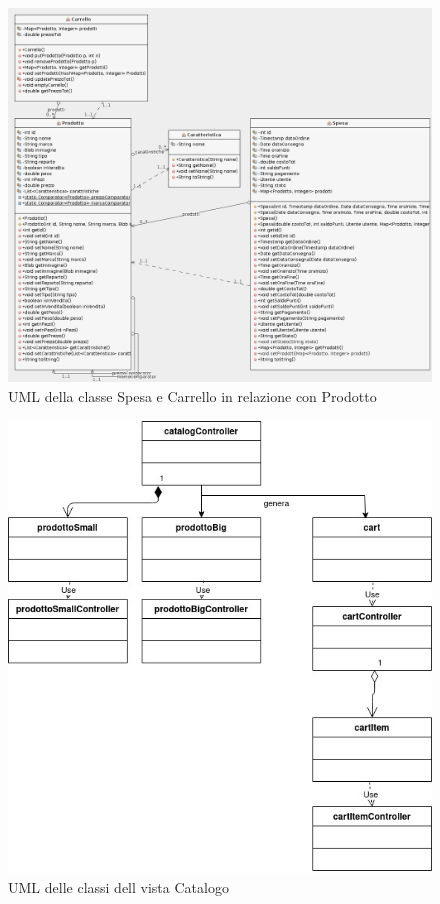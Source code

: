 \documentclass{article}
\begin{document}
\begin{figure}[h!]
	\centering
	\includegraphics[width=\textwidth]{UmlSpesa.png}
	\caption{UML della classe Spesa e Carrello in relazione con Prodotto}
	\label{fig:UmlSpesa}
\end{figure}


\begin{figure}[h!]
	\centering
	\includegraphics[width=\textwidth]{UmlCatalog.jpg}
	\caption{UML delle classi dell vista Catalogo}
	\label{fig:UmlCatalog}
\end{figure}
\end{document}
